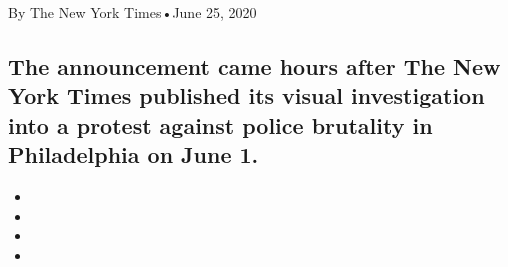 By The New York Times•June 25, 2020

\hypertarget{the-announcement-came-hours-after-the-new-york-times-published-its-visual-investigation-into-a-protest-against-police-brutality-in-philadelphia-on-june-1-1}{%
\subsection{The announcement came hours after The New York Times
published its visual investigation into a protest against police
brutality in Philadelphia on June
1.}\label{the-announcement-came-hours-after-the-new-york-times-published-its-visual-investigation-into-a-protest-against-police-brutality-in-philadelphia-on-june-1-1}}

\begin{itemize}
\item
\item
\item
\item
\end{itemize}

